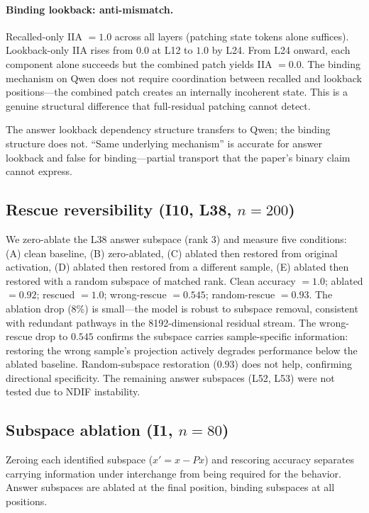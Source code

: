 \documentclass{article}
\begin{document}
\paragraph{Binding lookback: anti-mismatch.}
Recalled-only IIA $= 1.0$ across all layers (patching state tokens alone suffices). Lookback-only IIA rises from $0.0$ at L12 to $1.0$ by L24. From L24 onward, each component alone succeeds but the combined patch yields IIA $= 0.0$. The binding mechanism on Qwen does not require coordination between recalled and lookback positions---the combined patch creates an internally incoherent state. This is a genuine structural difference that full-residual patching cannot detect.

The answer lookback dependency structure transfers to Qwen; the binding structure does not. ``Same underlying mechanism'' is accurate for answer lookback and false for binding---partial transport that the paper's binary claim cannot express.

\subsection{Rescue reversibility (I10, L38, $n = 200$)}

We zero-ablate the L38 answer subspace (rank 3) and measure five conditions: (A) clean baseline, (B) zero-ablated, (C) ablated then restored from original activation, (D) ablated then restored from a different sample, (E) ablated then restored with a random subspace of matched rank. Clean accuracy $= 1.0$; ablated $= 0.92$; rescued $= 1.0$; wrong-rescue $= 0.545$; random-rescue $= 0.93$. The ablation drop (8\%) is small---the model is robust to subspace removal, consistent with redundant pathways in the 8192-dimensional residual stream. The wrong-rescue drop to $0.545$ confirms the subspace carries sample-specific information: restoring the wrong sample's projection actively degrades performance below the ablated baseline. Random-subspace restoration ($0.93$) does not help, confirming directional specificity. The remaining answer subspaces (L52, L53) were not tested due to NDIF instability.

\subsection{Subspace ablation (I1, $n = 80$)}
\label{sec:ablation}

Zeroing each identified subspace ($x' = x - Px$) and rescoring accuracy separates carrying
information under interchange from being required for the behavior. Answer subspaces are
ablated at the final position, binding subspaces at all positions.
\end{document}
